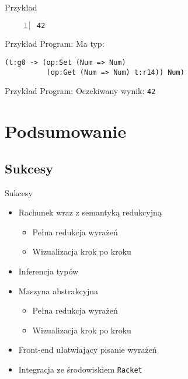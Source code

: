 \documentclass{beamer}
\newcommand{\Racket}{\texttt{Racket}}
\begin{document}
\begin{frame}[fragile]{Przykład}
\begin{Verbatim}[commandchars=\\\{\},numbers=left]
42
\end{Verbatim}
\end{frame}

\begin{frame}[fragile]{Przykład}
  Program:
  \pause
  Ma typ:
  \pause
\begin{verbatim}
(t:g0 -> (op:Set (Num => Num)
          (op:Get (Num => Num) t:r14)) Num)
\end{verbatim}
\end{frame}

\begin{frame}[fragile]{Przykład}
Program:
Oczekiwany wynik:
\texttt{42}
\end{frame}

\section{Podsumowanie}
\subsection{Sukcesy}
\begin{frame}{Sukcesy}
  \begin{itemize}
    \item Rachunek wraz z semantyką redukcyjną
    \begin{itemize}
      \pause
      \item Pełna redukcja wyrażeń
      \pause
      \item Wizualizacja krok po kroku
    \end{itemize}
    \pause
    \item Inferencja typów
    \pause
    \item Maszyna abstrakcyjna
    \begin{itemize}
      \pause
      \item Pełna redukcja wyrażeń
      \pause
      \item Wizualizacja krok po kroku
    \end{itemize}
    \pause
    \item Front-end ułatwiający pisanie wyrażeń
    \pause
    \item Integracja ze środowiskiem \Racket{}
  \end{itemize}
\end{frame}
\end{document}
